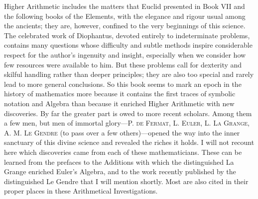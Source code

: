 Higher Arithmetic includes the matters that Euclid presented in Book VII and the following books of the Elements, with the elegance and rigour usual among the ancients; they are, however, confined to the very beginnings of this science. The celebrated work of Diophantus, devoted entirely to indeterminate problems, contains many questions whose difficulty and subtle methods inspire considerable respect for the author's ingenuity and insight, especially when we consider how few resources were available to him. But these problems call for dexterity and skilful handling rather than deeper principles; they are also too special and rarely lead to more general conclusions. So this book seems to mark an epoch in the history of mathematics more because it contains the first traces of symbolic notation and Algebra than because it enriched Higher Arithmetic with new discoveries. By far the greater part is owed to more recent scholars. Among them a few men, but men of immortal glory---P. \textsc{de Fermat}, L. \textsc{Euler}, L. \textsc{La Grange}, A. M. \textsc{Le Gendre} (to pass over a few others)---opened the way into the inner sanctuary of this divine science and revealed the riches it holds. I will not recount here which discoveries came from each of these mathematicians. These can be learned from the prefaces to the Additions with which the distinguished La Grange enriched Euler's Algebra, and to the work recently published by the distinguished Le Gendre that I will mention shortly. Most are also cited in their proper places in these Arithmetical Investigations.

